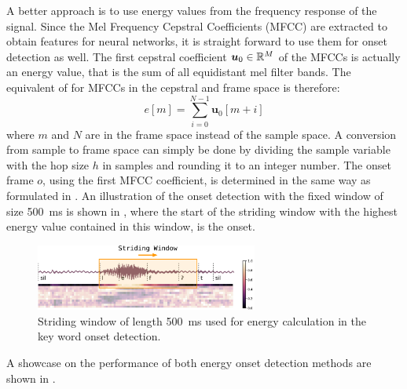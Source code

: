 A better approach is to use energy values from the frequency response of the signal.
Since the Mel Frequency Cepstral Coefficients (MFCC) are extracted to obtain features for neural networks, it is straight forward to use them for onset detection as well.
The first cepstral coefficient $\bm{u}_0 \in \mathbb{R}^M$ of the MFCCs is actually an energy value, that is the sum of all equidistant mel filter bands.
The equivalent of  for MFCCs in the cepstral and frame space is therefore:
\begin{equation}
  e[m] = \sum_{i=0}^{N-1} \bm{u}_0[m + i]
\end{equation}
where $m$ and $N$ are in the frame space instead of the sample space.
A conversion from sample to frame space can simply be done by dividing the sample variable with the hop size $h$ in samples and rounding it to an integer number.
The onset frame $o$, using the first MFCC coefficient, is determined in the same way as formulated in .
An illustration of the onset detection with the fixed window of size \SI{500}{\milli\second} is shown in , where
the start of the striding window with the highest energy value contained in this window, is the onset.
\begin{figure}[!ht]
  \centering
    \includegraphics[width=0.65\textwidth]{./3_signal/figs/signal_onset_window}
  \caption{Striding window of length \SI{500}{\milli\second} used for energy calculation in the key word onset detection.}
  \label{fig:signal_onset_window}
\end{figure}
\FloatBarrier
\noindent
A showcase on the performance of both energy onset detection methods are shown in .
